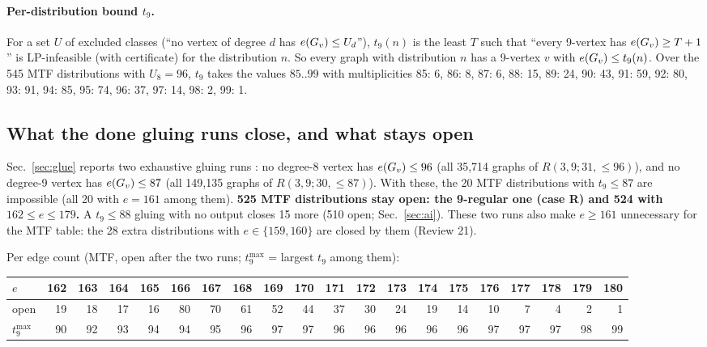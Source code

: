 \paragraph{Per-distribution bound $t_9$.} For a set $U$ of excluded classes (``no vertex of degree $d$ has $e(G_{v}) \le U_d$''), $t_9(n)$ is
the least $T$ such that ``every 9-vertex has $e(G_{v}) \ge T + 1$'' is LP-infeasible (with certificate) for the
distribution $n$. So every graph with distribution $n$ has a 9-vertex $v$ with $e(G_{v}) \le t_9(n)$. Over the 545 MTF
distributions with $U_8 = 96$, $t_9$ takes the values $85..99$ with multiplicities
85: 6, 86: 8, 87: 6, 88: 15, 89: 24, 90: 43, 91: 59, 92: 80, 93: 91, 94: 85, 95: 74, 96: 37, 97: 14, 98: 2, 99: 1.

\subsection{What the done gluing runs close, and what stays open}\label{sec:open}
Sec.~\ref{sec:glue} reports two exhaustive gluing runs : no degree-8 vertex has $e(G_{v}) \le 96$ (all 35,714 graphs of
$R(3,9;31,{\le}96)$), and no degree-9 vertex has $e(G_{v}) \le 87$ (all 149,135 graphs of $R(3,9;30,{\le}87)$).
With these, the 20 MTF distributions with $t_9 \le 87$ are impossible (all 20 with $e = 161$ among them). \textbf{525 MTF
distributions stay open: the 9-regular one (case R) and 524 with $162 \le e \le 179$.} 
A $t_9 \le 88$ gluing with no output closes 15 more (510 open; Sec.~\ref{sec:ai}).
These two runs also make $e \ge 161$ unnecessary for the MTF table: the 28 extra distributions with $e \in \{159, 160\}$
are closed by them (Review 21).

Per edge count (MTF, open after the two runs; $t_9^{\max}$ = largest $t_9$ among them):

\begin{center}\footnotesize\setlength{\tabcolsep}{3pt}
\begin{tabular}{@{}l*{19}{r}@{}}
\toprule
$e$ & 162 & 163 & 164 & 165 & 166 & 167 & 168 & 169 & 170 & 171 & 172 & 173 & 174 & 175 & 176 & 177 & 178 & 179 & 180 \\
\midrule
open & 19 & 18 & 17 & 16 & 80 & 70 & 61 & 52 & 44 & 37 & 30 & 24 & 19 & 14 & 10 & 7 & 4 & 2 & 1 \\
$t_9^{\max}$ & 90 & 92 & 93 & 94 & 94 & 95 & 96 & 97 & 97 & 96 & 96 & 96 & 96 & 96 & 97 & 97 & 97 & 98 & 99 \\
\bottomrule
\end{tabular}
\end{center}

